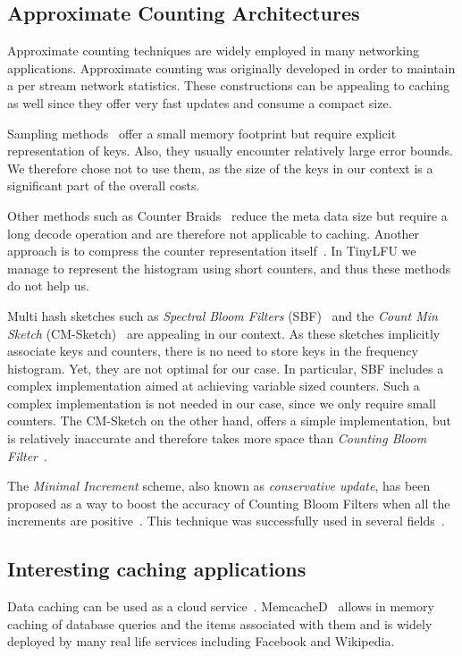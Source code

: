 \documentclass[10pt,a4paper]{article}
\begin{document}
\subsection{Approximate Counting Architectures}

Approximate counting techniques are widely employed in many networking applications. Approximate counting was originally developed
in order to maintain a per stream network statistics. These constructions can be appealing to caching as well since they offer very
fast updates and consume a compact size.

Sampling methods~\cite{Sample1,Sample2,Sample3} offer a small memory footprint but require explicit representation of keys.
Also, they usually encounter relatively large error bounds. We therefore chose not to use them, as the size of the keys in our context is a
significant part of the overall costs.


Other methods such as Counter Braids~\cite{CounterBraids} reduce the meta data size but require a long decode operation and are therefore not applicable to caching.
Another approach is to compress the counter representation itself~\cite{SAC,DISCO,CEDAR,ICE-Buckets}.
In TinyLFU we manage to represent the histogram using short counters, and thus these methods do not help us.

Multi hash sketches such as \emph{Spectral Bloom Filters} (SBF)~\cite{SpectralBloom} and the \emph{Count Min Sketch} (CM-Sketch)~\cite{CountMinSketch} are appealing in our context.
As these sketches implicitly associate keys and counters, there is no need to store keys in the frequency histogram. Yet, they are not optimal for our case.
In particular, SBF includes a complex implementation aimed at achieving variable sized counters. Such a complex implementation is not needed in our case,
since we only require small counters.
The CM-Sketch on the other hand, offers a simple implementation, but is relatively inaccurate and therefore takes more space than \emph{Counting Bloom Filter}~\cite{CountingBloom}.

The \emph{Minimal Increment} scheme, also known as \emph{conservative update}, has been proposed as a way to boost the accuracy of Counting Bloom Filters when all the increments are positive~\cite{SpectralBloom,CUSketch,CUAnal}.
This technique was successfully used in several fields~\cite{USAGE1,USAGE2,USAGE3,USAGE4,USAGE5,USAGE6,Networking2LowPass,NLP1,NLP2}.


\subsection{Interesting caching applications}
Data caching can be used as a cloud service~\cite{Cloud1,Cloud2}. MemcacheD~\cite{MemCacheD} allows in memory caching of database queries and the items associated with them and is widely deployed by
many real life services including Facebook and Wikipedia.
\end{document}
